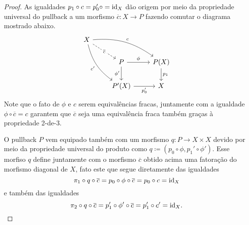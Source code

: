 \begin{proof}
  As igualdades $p_{1} \circ c = p_{0}' \circ  = \mathrm{id}_{X}$ dão origem por meio da propriedade universal do pullback a um morfismo $\overline{c}: X \to P$ fazendo comutar o diagrama mostrado abaixo.
  \begin{displaymath}
    \begin{tikzcd}
      X
      \arrow[rrd, bend left=20, "c"]
      \arrow[rdd, bend right=20, "c'" swap]
      \arrow[rd, dashed, "\overline{c}" description]
      \\ & P
      \arrow[r, "\phi"]
      \arrow[d, "\phi'" swap]
      & P(X)
      \arrow[d, "p_{1}"]
      \\ & P'(X)
      \arrow[r, "p_{0}'" swap]
      & X
    \end{tikzcd}
  \end{displaymath}
  Note que o fato de $\phi$ e $c$ serem equivalências fracas, juntamente com a igualdade $\phi \circ \overline{c} = c$ garantem que $\overline{c}$ seja uma equivalência fraca também graças à propriedade 2-de-3.

  O pullback $P$ vem equipado também com um morfismo $q: P \to X \times X$ devido por meio da propriedade universal do produto como $q \coloneqq (p_{0} \circ \phi, p_{1}' \circ \phi')$.
  Esse morfiso $q$ define juntamente com o morfismo $\overline{c}$ obtido acima uma fatoração do morfismo diagonal de $X$, fato este que segue diretamente das igualdades
  \begin{displaymath}
    \pi_{1} \circ q \circ \overline{c} = p_{0} \circ \phi \circ \overline{c} = p_{0} \circ c = \mathrm{id}_{X}
  \end{displaymath}
  e também das igualdades
  \begin{displaymath}
    \pi_{2} \circ q \circ \overline{c} = p_{1}' \circ \phi' \circ \overline{c} = p_{1}' \circ c' = \mathrm{id}_{X}.
  \end{displaymath}


\end{proof}
